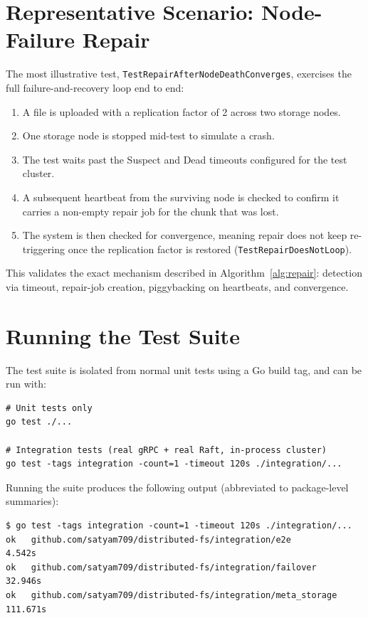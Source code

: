 \documentclass[12pt,a4paper]{report}
\begin{document}
\section{Representative Scenario: Node-Failure Repair}

The most illustrative test, \texttt{TestRepairAfterNodeDeathConverges}, exercises the full failure-and-recovery loop end to end:
\begin{enumerate}[nosep]
    \item A file is uploaded with a replication factor of 2 across two storage nodes.
    \item One storage node is stopped mid-test to simulate a crash.
    \item The test waits past the Suspect and Dead timeouts configured for the test cluster.
    \item A subsequent heartbeat from the surviving node is checked to confirm it carries a non-empty repair job for the chunk that was lost.
    \item The system is then checked for convergence, meaning repair does not keep re-triggering once the replication factor is restored (\texttt{TestRepairDoesNotLoop}).
\end{enumerate}

This validates the exact mechanism described in Algorithm~\ref{alg:repair}: detection via timeout, repair-job creation, piggybacking on heartbeats, and convergence.

\section{Running the Test Suite}

The test suite is isolated from normal unit tests using a Go build tag, and can be run with:
\begin{verbatim}
# Unit tests only
go test ./...

# Integration tests (real gRPC + real Raft, in-process cluster)
go test -tags integration -count=1 -timeout 120s ./integration/...
\end{verbatim}

Running the suite produces the following output (abbreviated to package-level summaries):

\begin{verbatim}
$ go test -tags integration -count=1 -timeout 120s ./integration/...
ok   github.com/satyam709/distributed-fs/integration/e2e           4.542s
ok   github.com/satyam709/distributed-fs/integration/failover      32.946s
ok   github.com/satyam709/distributed-fs/integration/meta_storage  111.671s
\end{verbatim}
\end{document}
